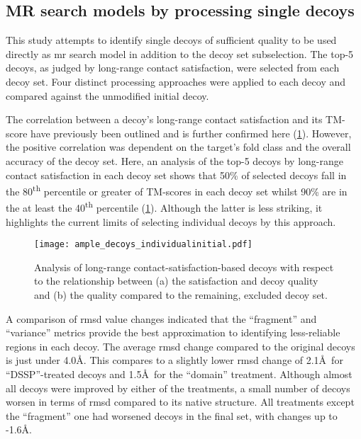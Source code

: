 \subsection{MR search models by processing single decoys}
This study attempts to identify single decoys of sufficient quality to be used directly as \gls{mr} search model in addition to the decoy set subselection. The top-5 decoys, as judged by long-range contact satisfaction, were selected from each decoy set. Four distinct processing approaches were applied to each decoy and compared against the unmodified initial decoy.

The correlation between a decoy's long-range contact satisfaction and its TM-score have previously been outlined and is further confirmed here (\cref{fig:ample_decoys_individualinitial}). However, the positive correlation was dependent on the target's fold class and the overall accuracy of the decoy set. Here, an analysis of the top-5 decoys by long-range contact satisfaction in each decoy set shows that 50\% of selected decoys fall in the 80\textsuperscript{th} percentile or greater of TM-scores in each decoy set whilst 90\% are in the at least the 40\textsuperscript{th} percentile (\cref{fig:ample_decoys_individualinitial}). Although the latter is less striking, it highlights the current limits of selecting individual decoys by this approach.

\begin{figure}[H]
	\centering
	\texttt{[image: ample\_decoys\_individualinitial.pdf]}
        \caption[Selection of single decoys by long-range satisfaction]{Analysis of long-range contact-satisfaction-based decoys with respect to the relationship between (a) the satisfaction and decoy quality and (b) the quality compared to the remaining, excluded decoy set.}
	\label{fig:ample_decoys_individualinitial}
\end{figure}

A comparison of \gls{rmsd} value changes indicated that the ``fragment'' and ``variance'' metrics provide the best approximation to identifying less-reliable regions in each decoy. The average \gls{rmsd} change compared to the original decoys is just under 4.0\AA. This compares to a slightly lower \gls{rmsd} change of 2.1\AA\ for ``DSSP''-treated decoys and 1.5\AA\ for the ``domain'' treatment. Although almost all decoys were improved by either of the treatments, a small number of decoys worsen in terms of \gls{rmsd} compared to its native structure. All treatments except the ``fragment'' one had worsened decoys in the final set, with changes up to -1.6\AA. 

